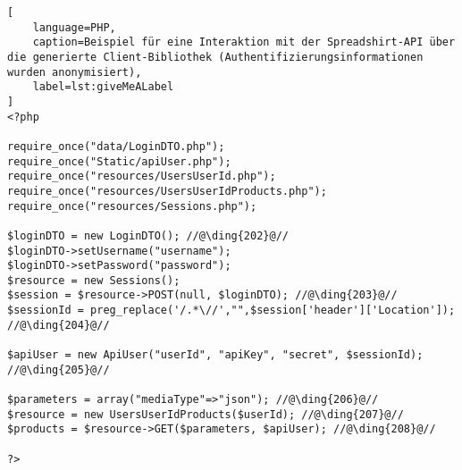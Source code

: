 \begin{minipage}{\textwidth}
\begin{lstlisting}[
    language=PHP,
    caption=Beispiel für eine Interaktion mit der Spreadshirt-API über die generierte Client-Bibliothek (Authentifizierungsinformationen wurden anonymisiert),
    label=lst:giveMeALabel
]
<?php

require_once("data/LoginDTO.php");
require_once("Static/apiUser.php");
require_once("resources/UsersUserId.php");
require_once("resources/UsersUserIdProducts.php");
require_once("resources/Sessions.php");

$loginDTO = new LoginDTO(); //@\ding{202}@//
$loginDTO->setUsername("username");
$loginDTO->setPassword("password");
$resource = new Sessions();
$session = $resource->POST(null, $loginDTO); //@\ding{203}@//
$sessionId = preg_replace('/.*\//',"",$session['header']['Location']); //@\ding{204}@//

$apiUser = new ApiUser("userId", "apiKey", "secret", $sessionId); //@\ding{205}@//

$parameters = array("mediaType"=>"json"); //@\ding{206}@//
$resource = new UsersUserIdProducts($userId); //@\ding{207}@//
$products = $resource->GET($parameters, $apiUser); //@\ding{208}@//

?>
\end{lstlisting}
\end{minipage}

